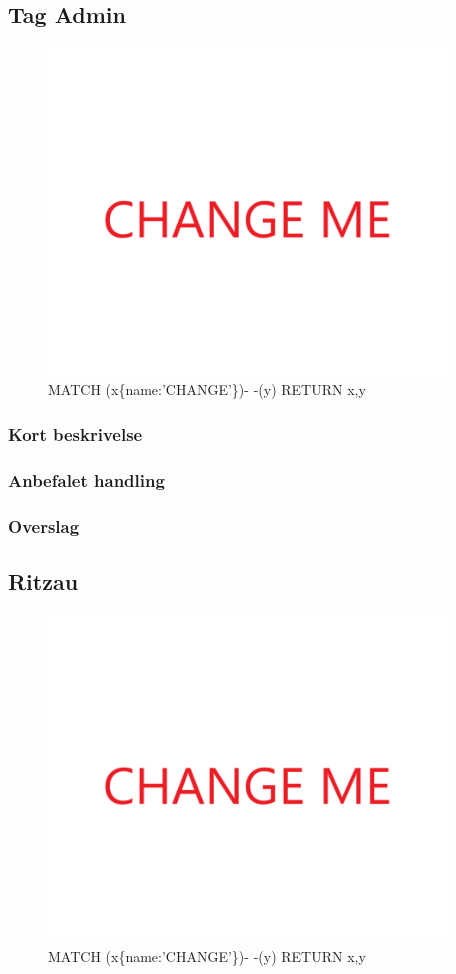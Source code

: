 \documentclass{article}
\begin{document}
\subsection{Tag Admin}
\begin{figure}[h]
\includegraphics[width=300pt]{CHANGE.PNG}
\caption{MATCH (x\{name:'CHANGE'\})- -(y) RETURN x,y}
\end{figure}
\subsubsection{Kort beskrivelse}
\subsubsection{Anbefalet handling}
\subsubsection{Overslag}
\subsection{Ritzau}
\begin{figure}[h]
\includegraphics[width=300pt]{CHANGE.PNG}
\caption{MATCH (x\{name:'CHANGE'\})- -(y) RETURN x,y}
\end{figure}
\end{document}
